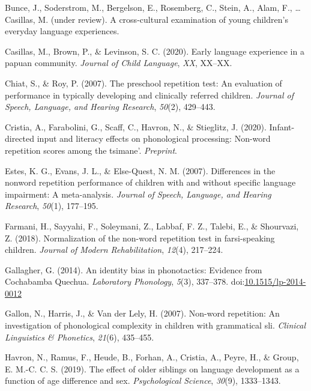 \documentclass[english,,man,floatsintext]{apa6}
\begin{document}
\hypertarget{ref-bunceURcrosscultural}{}
Bunce, J., Soderstrom, M., Bergelson, E., Rosemberg, C., Stein, A.,
Alam, F., \ldots{} Casillas, M. (under review). A cross-cultural
examination of young children's everyday language experiences.

\hypertarget{ref-casillas2020early}{}
Casillas, M., Brown, P., \& Levinson, S. C. (2020). Early language
experience in a papuan community. \emph{Journal of Child Language},
\emph{XX}, XX--XX.

\hypertarget{ref-chiat2007preschool}{}
Chiat, S., \& Roy, P. (2007). The preschool repetition test: An
evaluation of performance in typically developing and clinically
referred children. \emph{Journal of Speech, Language, and Hearing
Research}, \emph{50}(2), 429--443.

\hypertarget{ref-cristia2020infant}{}
Cristia, A., Farabolini, G., Scaff, C., Havron, N., \& Stieglitz, J.
(2020). Infant-directed input and literacy effects on phonological
processing: Non-word repetition scores among the tsimane'.
\emph{Preprint}.

\hypertarget{ref-estes2007differences}{}
Estes, K. G., Evans, J. L., \& Else-Quest, N. M. (2007). Differences in
the nonword repetition performance of children with and without specific
language impairment: A meta-analysis. \emph{Journal of Speech, Language,
and Hearing Research}, \emph{50}(1), 177--195.

\hypertarget{ref-farmani2018normalization}{}
Farmani, H., Sayyahi, F., Soleymani, Z., Labbaf, F. Z., Talebi, E., \&
Shourvazi, Z. (2018). Normalization of the non-word repetition test in
farsi-speaking children. \emph{Journal of Modern Rehabilitation},
\emph{12}(4), 217--224.

\hypertarget{ref-gallagher2014identity}{}
Gallagher, G. (2014). An identity bias in phonotactics: Evidence from
Cochabamba Quechua. \emph{Laboratory Phonology}, \emph{5}(3), 337--378.
doi:\href{https://doi.org/10.1515/lp-2014-0012}{10.1515/lp-2014-0012}

\hypertarget{ref-gallon2007non}{}
Gallon, N., Harris, J., \& Van der Lely, H. (2007). Non-word repetition:
An investigation of phonological complexity in children with grammatical
sli. \emph{Clinical Linguistics \& Phonetics}, \emph{21}(6), 435--455.

\hypertarget{ref-havron2019effect}{}
Havron, N., Ramus, F., Heude, B., Forhan, A., Cristia, A., Peyre, H., \&
Group, E. M.-C. C. S. (2019). The effect of older siblings on language
development as a function of age difference and sex. \emph{Psychological
Science}, \emph{30}(9), 1333--1343.
\end{document}
